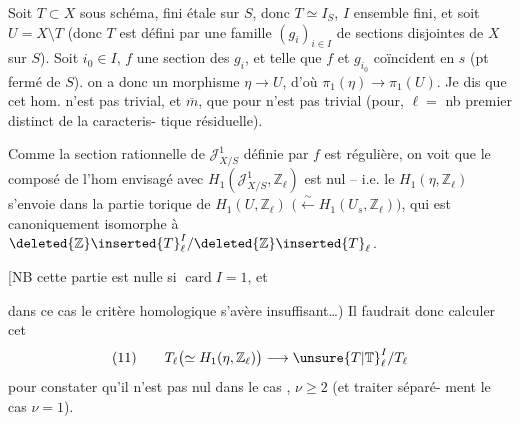 Soit $T\subset X$ sous schéma, fini étale sur $S$, donc $T\simeq I_S$, $I$ ensemble fini, et soit $U=X\setminus T$ (donc $T$ est défini par une famille $(g_i)_{i\in I}$ de sections disjointes de $X$ sur $S$).  Soit  $i_0\in I$, $f$ une section  des $g_i$, et telle que  $f$ et $g_{i_0}$ coïncident en $s$ (pt fermé de $S$).      on a donc un morphisme $\eta\longrightarrow U$, d'où $\pi_1(\eta)\longrightarrow\pi_1(U)$. Je dis que cet hom. n'est pas trivial,  et $\overline m$,  que pour 
n'est pas trivial (pour,  $\ell=$ nb premier distinct de la caracteris-\newline
tique résiduelle).

Comme la section rationnelle de $\mathcal J^1_{X/S}$ définie par $f$ est régulière, on voit que le composé de l'hom envisagé avec $H_1(\mathcal J^1_{X/S},\mathbb Z_\ell)$ est nul -- i.e. le $H_1(\eta,\mathbb Z_\ell)$ s'envoie dans la partie torique de $H_1(U,\mathbb Z_\ell)$ $\bigl(\xleftarrow{\sim}H_1(U_s,\mathbb Z_\ell)\bigr)$, qui est canoniquement isomorphe à $\deleted{\mathbb Z}\inserted{T}_\ell^I/\deleted{\mathbb Z}\inserted{T}_\ell$.

[NB cette partie est nulle si $\operatorname{card}I=1$, et

dans ce cas le critère homologique s'avère insuffisant\ldots) Il faudrait donc calculer cet 
\[
(11)\qquad T_\ell\bigl(\simeq H_1(\eta,\mathbb Z_\ell)\bigr)\longrightarrow\unsure{T|\mathbb T}_\ell^I/T_\ell
\]
pour constater qu'il n'est pas nul dans le cas , $\nu\geqslant2$ (et traiter séparé-\newline
ment le cas $\nu=1$).


